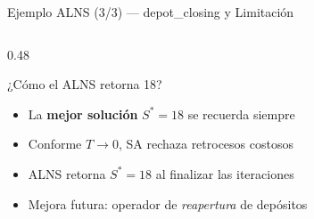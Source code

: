 \documentclass[aspectratio=169,10pt]{beamer}
\begin{document}
\begin{frame}{Ejemplo ALNS (3/3) --- depot\_closing y Limitación}
\begin{columns}[T,onlytextwidth]
\begin{column}{0.48\textwidth}
      \vspace{0.4em}
      \begin{block}{¿Cómo el ALNS retorna 18?}\small
        \begin{itemize}
          \item La \textbf{mejor solución} $S^*{=}18$ se recuerda siempre
          \item Conforme $T \to 0$, SA rechaza retrocesos costosos
          \item ALNS retorna $S^*{=}18$ al finalizar las iteraciones
          \item Mejora futura: operador de \textit{reapertura} de depósitos
        \end{itemize}
      \end{block}
    \end{column}
  \end{columns}
\end{frame}
\end{document}
